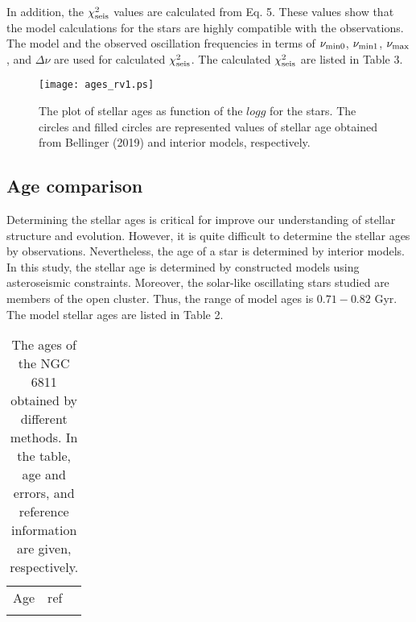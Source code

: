 \documentclass[a4paper,fleqn,usenatbib]{mnras}     %
\begin{document}
{In addition, the ${{\chi^2_{\rm seis}}}$ values are calculated from Eq. 5.
These values show that the model calculations 
for the stars are highly compatible with the observations.
The model and the observed oscillation frequencies in terms of 
${{\nu_{\rm min0}}}$, ${{\nu_{\rm min1}}}$, ${{\nu_{\rm max}}}$, and $\Delta\nu$
are used for calculated ${{\chi^2_{\rm seis}}}$. 
The calculated ${{\chi^2_{\rm seis}}}$ are listed in Table 3.

\begin{figure}
\begin{center}
\texttt{[image: ages\_rv1.ps]}
        \caption{ The plot of stellar ages as function of the  $logg$  for the stars. The circles and filled circles are represented values of stellar age obtained from Bellinger (2019) and interior models, respectively. %
}
\end{center}
\end{figure}

\subsection{Age comparison}
Determining the stellar ages is critical for 
improve our understanding of stellar structure and evolution.
However, it is quite difficult to 
determine the stellar ages by observations.
Nevertheless, the age of a star is determined by interior models.
In this study, the stellar age is determined 
by constructed models using asteroseismic constraints.
Moreover, the solar-like oscillating 
stars studied are members of the open cluster. 
Thus, the range of model ages is  $0.71- 0.82$ Gyr.
The model stellar ages are listed in Table 2.

\begin{table}
\begin{center}
        \caption{The ages of the NGC 6811 obtained by different methods.
In the table, age and errors, and reference information are given, respectively. %
}
        \begin{tabular}{lcc}
                \hline
Age  &ref&\\ \\[1.0pt]


\end{tabular}
\end{center}
\end{table}}
\end{document}
